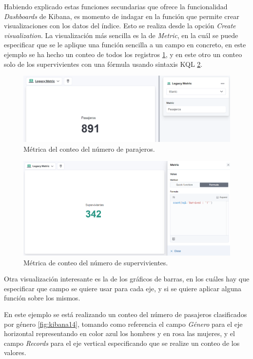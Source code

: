 Habiendo explicado estas funciones secundarias que ofrece la funcionalidad \textit{Dashboards} de Kibana, es momento de indagar en la función que permite crear visualizaciones con los datos del índice. Esto se realiza desde la opción \textit{Create visualization}. La visualización más sencilla es la de \textit{Metric}, en la cuál se puede especificar que se le aplique una función sencilla a un campo en concreto, en este ejemplo se ha hecho un conteo de todos los registros \ref{fig:kibana12}, y en este otro un conteo solo de los supervivientes con una fórmula usando sintaxis KQL \ref{fig:kibana13}.

\begin{figure}
    \centering
    \includegraphics[width=1\linewidth]{img/kibana12.png}
    \caption{Métrica del conteo del número de parajeros.}
    \label{fig:kibana12}
\end{figure}
\begin{figure}
    \centering
    \includegraphics[width=1\linewidth]{img/kibana13.png}
    \caption{Métrica de conteo del número de supervivientes.}
    \label{fig:kibana13}
\end{figure}

Otra visualización interesante es la de los gráficos de barras, en los cuáles hay que especificar que campo se quiere usar para cada eje, y si se quiere aplicar alguna función sobre los mismos.

En este ejemplo se está realizando un conteo del número de pasajeros clasificados por género \ref{fig:kibana14}, tomando como referencia el campo \textit{Género} para el eje horizontal representando en color azul los hombres y en rosa las mujeres, y el campo \textit{Records} para el eje vertical especificando que se realize un conteo de los valores.

